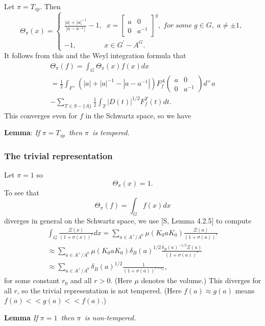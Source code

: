 Let $\pi =T_{sp}$. Then{\em \ } 
\[
\Theta _\pi (x)=\left\{ 
\begin{array}{c}
\frac{|a|+|a|^{-1}}{|a-a^{-1}|}-1,\;\;x=\left[ 
\begin{array}{cc}
a & 0 \\ 
0 & a^{-1}
\end{array}
\right] ^g,\;for\;some\;g\in G,\;a\neq \pm 1, \\ 
-1,\;\;\;\;\;\;\;\;\;\;\;\;\;\;x\in G^{\prime }-A^G.
\end{array}
\right. 
\]
It follows from this and the Weyl integration formula that 
\[
\begin{array}{c}
\Theta _\pi (f)=\int_G\Theta _\pi (x)f(x)dx \\ 
=\frac 12\int_{F^{\times }}(|a|+|a|^{-1}-|a-a^{-1}|)F_f^A( 
\begin{array}{cc}
a & 0 \\ 
0 & a^{-1}
\end{array}
)d^{\times }a \\ 
-\sum_{T\in S-\{A\}}\frac 12\int_T|D(t)|^{1/2}F_f^T(t)dt.
\end{array}
\]
This converges even for $f$ in the Schwartz space, so we have

{\bf Lemma}: {\em If }$\pi =T_{sp}${\em \ then }$\pi ${\em \ is tempered.}

\subsubsection{The trivial representation}

Let $\pi =1$ so{\em \ } 
\[
\Theta _\pi (x)=1. 
\]
To see that 
\[
\Theta _\pi (f)=\int_Gf(x)dx 
\]
diverges in general on the Schwartz space, we use [S, Lemma 4.2.5] to
compute 
\[
\begin{array}{c}
\int_G \frac{\Xi (x)}{(1+\sigma (x))^r}dx=\sum_{a\in A^{+}/A^0}\mu (K_0aK_0)%
\frac{\Xi (a)}{(1+\sigma (a))^r} \\ 
\approx \sum_{a\in A^{+}/A^0}\mu (K_0aK_0)\delta _B(a)^{1/2} \frac{\delta
_B(a)^{-1/2}\Xi (a)}{(1+\sigma (a))^r} \\ 
\approx \sum_{a\in A^{+}/A^0}\delta _B(a)^{1/2}\frac 1{(1+\sigma
(a))^{r-r_0}},
\end{array}
\]
for some constant $r_0$ and all $r>0$. (Here $\mu $ denotes the volume.)
This diverges for all $r$, so the trivial representation is not tempered.
(Here $f(a)\approx g(a)$ means $f(a)<<g(a)<<f(a)$.)

{\bf Lemma} {\em If }$\pi =1${\em \ then }$\pi ${\em \ is non-tempered.}

